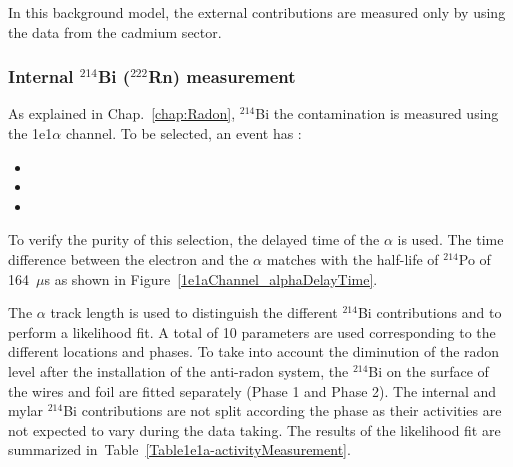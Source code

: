 \documentclass[main.tex]{subfiles}
\begin{document}
In this background model, the external contributions are measured only by using the data from the cadmium sector.


\FloatBarrier


\subsubsection{Internal $^{\text{214}}$Bi ($^{\text{222}}$Rn) measurement}


\NI As explained in Chap.~\ref{chap:Radon}, $^{\text{214}}$Bi the contamination is measured using the 1e1$\alpha$ channel. To be selected, an event has : 


\begin{itemize}
\item
\item
\item
\end{itemize}


\NI To verify the purity of this selection, the delayed time of the $\alpha$ is used. The time difference between the electron and the $\alpha$ matches with the half-life of $^{\text{214}}$Po of 164~$\mu$s as shown in Figure~\ref{1e1aChannel_alphaDelayTime}.


\bigskip


\NI The $\alpha$ track length is used to distinguish the different $^{\text{214}}$Bi contributions and to perform a likelihood fit. A total of 10 parameters are used corresponding to the different locations and phases. To take into account the diminution of the radon level after the installation of the anti-radon system, the $^{\text{214}}$Bi on the surface of the wires and foil are fitted separately (Phase 1 and Phase 2). The internal and mylar $^{\text{214}}$Bi contributions are not split according the phase as their activities are not expected to vary during the data taking. The results of the likelihood fit are summarized in~Table~\ref{Table1e1a-activityMeasurement}.
\end{document}
